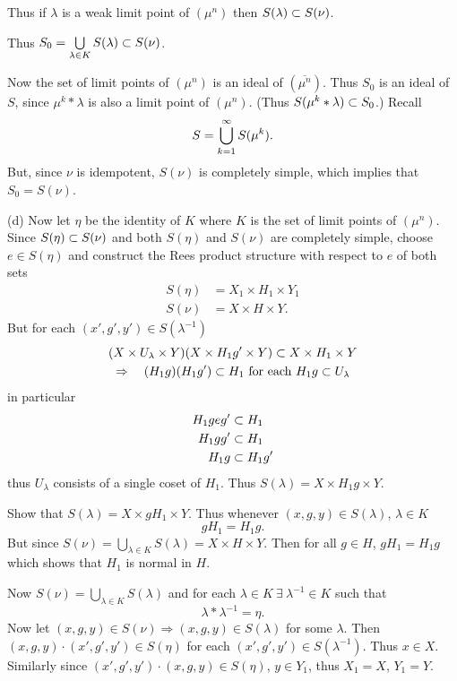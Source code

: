  Thus if $\lambda$ is a weak limit point of $(\mu^n)$ then $S(\lambda) \subset S(\nu)$.

Thus $S_0 = \bigcup\limits_{\lambda\in K} S(\lambda) \subset S(\nu)$.

Now the set of limit points of $(\mu^n)$ is an ideal of $(\overline{\mu^n})$.  Thus $S_0$ is an ideal of $S$, since $\mu^k * \lambda$ is also a limit point of $(\mu^n)$.  
(Thus $S(\mu^k * \lambda) \subset S_0$.)  
Recall
\[
     S = \bigcup^\infty_{k=1} S(\mu^k).
\]
But, since $\nu$ is idempotent, $S(\nu)$ is completely simple, which
implies that $S_0 = S(\nu)$.

     (d)  Now let $\eta$ be the identity of $K$ where $K$ is the set
of limit points of $(\mu^n)$.  Since $S(\eta) \subset S(\nu)$ and both
$S(\eta)$ and $S(\nu)$ are completely simple, choose $e \in S(\eta)$
and construct the Rees product structure with respect to $e$ of both
sets
\[
\begin{aligned}
       S(\eta) &= X_1 \times H_1 \times Y_1                 \\
       S(\nu) &= X \times H \times Y.
\end{aligned}
\]
But for each $(x',g',y') \in S(\lambda^{-1})$
\[
\begin{gathered}
       (X \times U_{\lambda} \times Y)(X \times H_1g' \times Y) \subset X \times H_1 \times Y  \\
       \Rightarrow \quad (H_1 g)(H_1 g') \subset H_1
               \hbox{ for each } H_1 g \subset U_\lambda
\end{gathered}
\]
in particular
\[
\begin{aligned}
       H_1 geg' &\subset H_1                           \\
       H_1 gg' &\subset H_1                            \\
       H_1 g &\subset H_1 g'
\end{aligned}
\]
thus $U_\lambda$ consists of a single coset of $H_1$.  Thus $S(\lambda) = X \times
H_1 g \times Y$.

 Show that $S(\lambda) = X \times gH_1 \times Y$.  
Thus whenever $(x,g,y) \in S(\lambda)$, $\lambda \in K$
\[
     gH_1 = H_1 g.
\]
But since $S(\nu) = \bigcup\limits_{\lambda\in K} S(\lambda) = X \times H \times Y$.
Then for all $g \in H$, $gH_1 = H_1 g$ which shows that $H_1$ is
normal in $H$.

Now $S(\nu) = \bigcup\limits_{\lambda\in K} S(\lambda)$ and for each $\lambda \in K \ \exists\ \lambda^{-1} \in K$ such that
\[
     \lambda * \lambda^{-1} = \eta.
\]
Now let $(x,g,y) \in S(\nu) \Rightarrow (x,g,y) \in S(\lambda)$ for some $\lambda$.
Then $(x,g,y) \cdot (x',g',y') \in S(\eta)$ for each $(x',g',y') \in
S(\lambda^{-1})$.  
Thus $x \in X$.  Similarly since $(x',g',y') \cdot (x,g,y) \in S(\eta)$, $y \in Y_1$, thus $X_1 = X$, $Y_1 = Y$.

